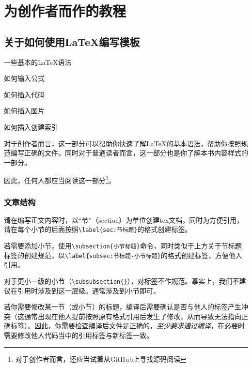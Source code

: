 \chapter{为创作者而作的教程}
\section{关于如何使用\LaTeX 编写模板}\label{sec:关于如何使用LaTeX编写模板}


\begin{Abstract}
    \item 一些基本的\LaTeX 语法
    \item 如何输入公式
    \item 如何插入代码
    \item 如何插入图片
    \item 如何插入创建索引
\end{Abstract}

对于创作者而言，这一部分可以帮助你快速了解\LaTeX 的基本语法，帮助你按照规范编写正确的文件。同时对于普通读者而言，这一部分也是你了解本书内容样式的一部分。

因此，任何人都应当阅读这一部分\footnote{对于创作者而言，还应当试着从GitHub上寻找源码阅读}。

\subsection{文章结构}\label{subsec:关于如何使用LaTeX编写模板-文章结构}

请在编写正文内容时，以“节”（section）为单位创建tex文档，同时为方便引用，请在每个小节的后面按照\verb|\label{sec:节标题}|的格式创建标签。

若需要添加小节，使用\verb|\subsection{小节标题}|命令，同时类似于上方关于节标题标签的创建规范，以\verb|\label{subsec:节标题-小节标题}|的格式创建标签，方便他人引用。

对于更小一级的小节（\verb|\subsubsection{}|），对标签不作规范。事实上，我们不建议在引用时涉及到这一层级。通常涉及到小节即可。

\begin{attention}
    若你需要修改某一节（或小节）的标题，编译后需要确认是否与他人的标签产生冲突（这通常出现在他人提前按照原有格式引用后发生了修改，从而导致无法指向正确标签）。因此，你需要检查编译后文件是正确的，\emph{至少要求通过编译}，在必要时需要修改他人代码当中的引用标签与新标签一致。
\end{attention}

